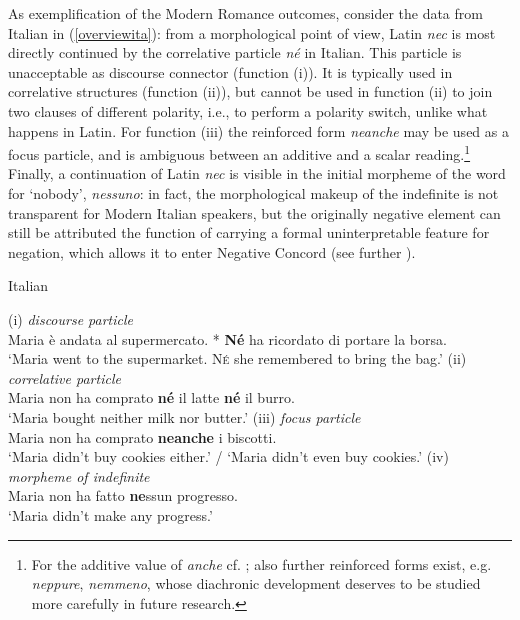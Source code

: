 \documentclass[output=paper,modfonts,nonflat,citecolor=brown,
showindex
]{langsci/langscibook}
\begin{document}
\noindent As exemplification of the Modern Romance outcomes, consider the data from Italian in (\ref{overviewita}): from a morphological point of view, Latin {\emph{nec}} is most directly continued by the correlative particle {\emph{n\'e}} in Italian. This particle is unacceptable as discourse connector (function (i)). It is typically used in correlative structures (function (ii)), but cannot be used in function (ii) to join two clauses of different polarity, i.e., to perform a polarity switch, unlike what happens in Latin. For function (iii) the reinforced form {\emph{neanche}} may be used as a focus particle, and is ambiguous between an additive and a scalar reading.{\footnote{For the additive value of {\emph{anche}} cf. \citet[]{Francoetal16b}; also further reinforced forms exist, e.g. {\emph{neppure}}, {\emph{nemmeno}}, whose diachronic development deserves to be studied more carefully in future research.}} Finally, a continuation of Latin {\emph{nec}} is visible in the initial morpheme of the word for `nobody', {\emph{nessuno}}: in fact, the morphological makeup of the indefinite is not transparent for Modern Italian speakers, but the originally negative element can still be attributed the function of carrying a formal uninterpretable feature for negation, which allows it to enter Negative Concord (see further ). 

{\begin{exe}
\ex \label{overviewita} Italian
\begin{xlist}
\ex \label{polswitchfirstex} (i) {\emph{discourse particle}}\\
Maria \`e andata al supermercato. * {\textbf{N\'e}} ha ricordato di portare la borsa.\\
`Maria went to the supermarket. {\textsc{N\'e}} she remembered to bring the bag.'
\ex (ii) {\emph{correlative particle}}\\
Maria non ha comprato {\textbf{n\'e}} il latte {\textbf{n\'e}} il burro.\\
`Maria bought neither milk nor butter.'
\ex (iii) {\emph{focus particle}}\\
Maria non ha comprato {\textbf{neanche}} i biscotti.\\ 
`Maria didn't buy cookies either.' / `Maria didn't even buy cookies.'
\ex (iv) {\emph{morpheme of indefinite}}\\
Maria non ha fatto {\textbf{ne}}ssun progresso.\\
`Maria didn't make any progress.'
\end{xlist}
\end{exe}}
\end{document}
